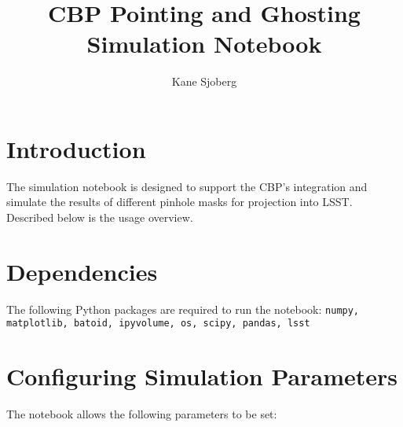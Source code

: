 \documentclass[SE,authoryear,toc]{lsstdoc}
\title{CBP Pointing and Ghosting Simulation Notebook}
\author{%
Kane Sjoberg
}
\date{\vcsDate}
\begin{document}
\maketitle


\section{Introduction}
The simulation notebook is designed to support the CBP's integration and simulate the results of different pinhole masks for projection into LSST. Described below is the usage overview. 

\section{Dependencies}
The following Python packages are required to run the notebook: \texttt{numpy, matplotlib, batoid, ipyvolume, os, scipy, pandas, lsst}

\section{Configuring Simulation Parameters}
The notebook allows the following parameters to be set:
\end{document}
